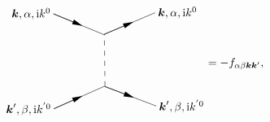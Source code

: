 \begin{equation}
    \begin{gathered}
        \begin{tikzpicture}[x=0.75pt,y=0.75pt,yscale=-1,xscale=1]
            \draw    (120.17,192.51) -- (151.95,178.32) ;
            \draw [shift={(153.77,177.5)}, rotate = 515.9300000000001] [fill={rgb, 255:red, 0; green, 0; blue, 0 }  ][line width=0.08]  [draw opacity=0] (12,-3) -- (0,0) -- (12,3) -- cycle    ;
            \draw    (120.17,192.51) -- (179.26,166.12) ;

            \draw  [dash pattern={on 4.5pt off 4.5pt}]  (180.29,166.04) -- (179.51,104.35) ;
            \draw    (179.7,166.12) -- (212.38,178.57) ;
            \draw [shift={(214.25,179.28)}, rotate = 200.85] [fill={rgb, 255:red, 0; green, 0; blue, 0 }  ][line width=0.08]  [draw opacity=0] (12,-3) -- (0,0) -- (12,3) -- cycle    ;
            \draw    (179.7,166.12) -- (240.46,189.26) ;

            \draw    (119.72,80.8) -- (151.97,94.12) ;
            \draw [shift={(153.82,94.88)}, rotate = 202.44] [fill={rgb, 255:red, 0; green, 0; blue, 0 }  ][line width=0.08]  [draw opacity=0] (12,-3) -- (0,0) -- (12,3) -- cycle    ;
            \draw    (119.72,80.8) -- (179.69,105.57) ;

            \draw    (179.57,104.84) -- (211.65,91.2) ;
            \draw [shift={(213.49,90.41)}, rotate = 516.96] [fill={rgb, 255:red, 0; green, 0; blue, 0 }  ][line width=0.08]  [draw opacity=0] (12,-3) -- (0,0) -- (12,3) -- cycle    ;
            \draw    (179.57,104.84) -- (239.22,79.47) ;


            \draw (117.72,80.8) node [anchor=east] [inner sep=0.75pt]    {$\boldsymbol{k} ,\alpha ,\mathrm{i} k^{0}$};
            \draw (241.22,79.47) node [anchor=west] [inner sep=0.75pt]    {$\boldsymbol{k} ,\alpha ,\mathrm{i} k^{0}$};
            \draw (118.17,192.51) node [anchor=east] [inner sep=0.75pt]    {$\boldsymbol{k} ',\beta ,\mathrm{i} k^{'0}$};
            \draw (242.46,189.26) node [anchor=west] [inner sep=0.75pt]    {$\boldsymbol{k} ',\beta ,\mathrm{i} k^{'0}$};
            \end{tikzpicture}
    \end{gathered} = - f_{\alpha \beta \vb*{k} \vb*{k}'},
    \label{eq:fermi-liquid-vertex}
\end{equation}